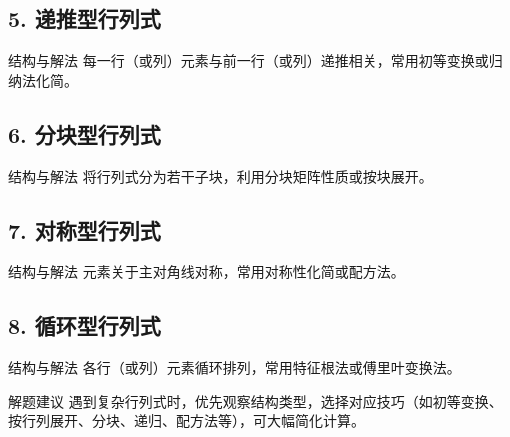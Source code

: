 \documentclass[UTF8]{ctexart}
\theoremstyle{mydef}
\begin{document}
\subsection{5. 递推型行列式}
\begin{mybox}{结构与解法}
每一行（或列）元素与前一行（或列）递推相关，常用初等变换或归纳法化简。
\end{mybox}

\subsection{6. 分块型行列式}
\begin{mybox}{结构与解法}
将行列式分为若干子块，利用分块矩阵性质或按块展开。
\end{mybox}

\subsection{7. 对称型行列式}
\begin{mybox}{结构与解法}
元素关于主对角线对称，常用对称性化简或配方法。
\end{mybox}

\subsection{8. 循环型行列式}
\begin{mybox}{结构与解法}
各行（或列）元素循环排列，常用特征根法或傅里叶变换法。
\end{mybox}

\begin{mybox}{解题建议}
遇到复杂行列式时，优先观察结构类型，选择对应技巧（如初等变换、按行列展开、分块、递归、配方法等），可大幅简化计算。
\end{mybox}
\end{document}
